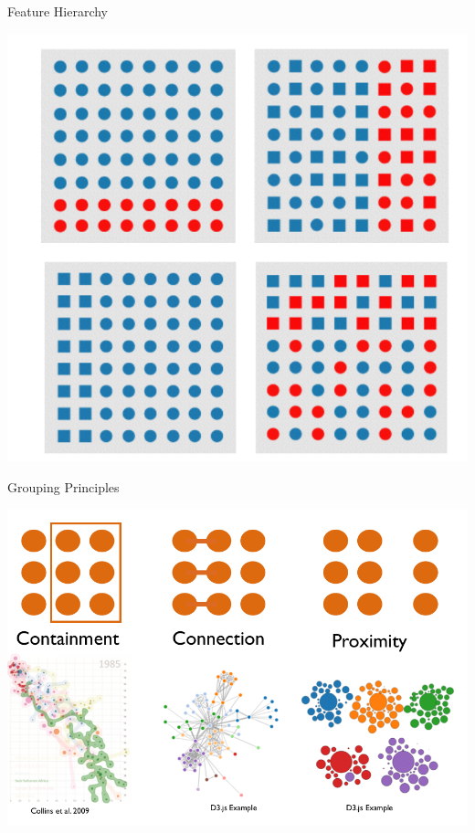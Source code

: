 \documentclass{beamer}
\begin{document}
\begin{frame}{Feature Hierarchy}
    \begin{center}
        \includegraphics[scale=0.3]{featureHierarchy.png}
    \end{center}
\end{frame}  
\begin{frame}{Grouping Principles}
    \begin{center}
        \includegraphics[scale=0.3]{groupingPrinciples.png}
    \end{center}
\end{frame}  
\end{document}
